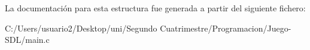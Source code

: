La documentación para esta estructura fue generada a partir del siguiente fichero\+:\begin{DoxyCompactItemize}
\item 
C\+:/\+Users/usuario2/\+Desktop/uni/\+Segundo Cuatrimestre/\+Programacion/\+Juego-\/\+S\+D\+L/main.\+c\end{DoxyCompactItemize}

